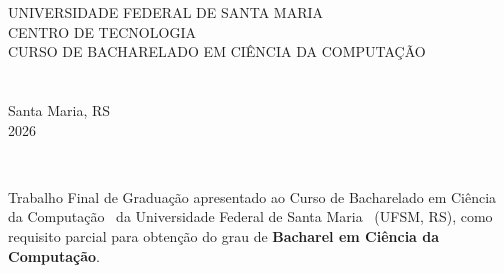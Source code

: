 \documentclass[
	article,			%
	12pt,				%
	oneside,			%
	a4paper,			%
	chapter=TITLE,		%
	section=TITLE,		%
	english,			%
	brazil,				%
    sumario=tradicional
	]{abntex2}
\newcommand{\MyInstitution}{Universidade Federal de Santa Maria}
\newcommand{\MyCenter}{Centro de Tecnologia}
\newcommand{\MyCourse}{Curso de Bacharelado em Ciência da Computação}
\newcommand{\MyDegree}{Bacharel em Ciência da Computação}
\newcommand{\MyLocation}{Santa Maria, RS}
\newcommand{\MyDescriptionText}{Trabalho Final de Graduação apresentado ao \MyCourse~ da \MyInstitution~ (UFSM, RS), como requisito parcial para obtenção do grau de \textbf{\MyDegree}.}
\newcommand{\MyYear}{2026}
\begin{document}








  \begin{center}
    {\noindent\large{{\MakeUppercase{\MyInstitution}}}}\\%
    {\large{{\MakeUppercase{\MyCenter}}}}\\%
    {\large{{\MakeUppercase{{\MyCourse}}}}}\\%
    \vspace{8\baselineskip}
    {\Large{\theauthor}}\\
    \vspace{8\baselineskip}
    {\large\MakeUppercase{\textbf{\thetitle}}}\\
    \vspace{\fill}
    {\large{\MyLocation}}\\
    {\large{\MyYear}}
 \end{center}

\newpage
     \begin{center}
        \textbf{\noindent\theauthor}\\
        \vspace{6.0\baselineskip}
        \MakeUppercase{\textbf{\noindent{\thetitle}}}
        \vspace{4.0\baselineskip}
     \end{center}   
     
     \noindent\begin{flushright}
     \noindent\begin{minipage}{0.5\textwidth}
     {\noindent \MyDescriptionText}
     \end{minipage}
     \end{flushright}
            \vspace{7\baselineskip}
 
\end{document}
